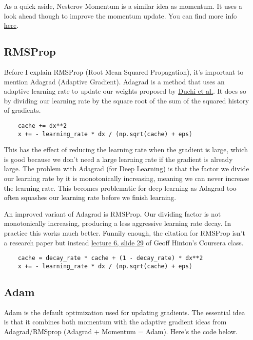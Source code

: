 \documentclass[12pt]{article}
\begin{document}
As a quick aside, Nesterov Momentum is a similar idea as momentum. It uses a look ahead though 
to improve the momentum update. You can find more info \href{https://cs231n.github.io/neural-networks-3/#sgd}{here}.

\subsection{RMSProp}
Before I explain RMSProp (Root Mean Squared Propagation), it's important to mention Adagrad (Adaptive
Gradient). Adagrad is a method that uses an adaptive learning rate to update our weights proposed by 
\href{https://jmlr.org/papers/v12/duchi11a.html}{Duchi et al.}. It does so 
by dividing our learning rate by the square root of the sum of the squared history of gradients. 

\begin{verbatim}
    cache += dx**2
    x += - learning_rate * dx / (np.sqrt(cache) + eps)
\end{verbatim}


This has the effect of reducing 
the learning rate when the gradient is large, which is good because we don't need a large learning rate
if the gradient is already large. The problem with Adagrad (for Deep Learning) is that the factor we divide 
our learning rate by it is monotonically increasing, meaning we can never increase the learning rate. 
This becomes problematic for deep learning as Adagrad too often squashes our learning rate before 
we finish learning. 

An improved variant of Adagrad is RMSProp. Our dividing factor is not monotonically increasing, 
producing a less aggressive learning rate decay. In practice this works much better. Funnily enough, 
the citation for RMSProp isn't a research paper but instead \href{http://www.cs.toronto.edu/~tijmen/csc321/slides/lecture_slides_lec6.pdf}
{lecture 6, slide 29} of Geoff Hinton's Coursera class. 

\begin{verbatim}
    cache = decay_rate * cache + (1 - decay_rate) * dx**2
    x += - learning_rate * dx / (np.sqrt(cache) + eps)
\end{verbatim}

\subsection{Adam}
Adam is the default optimization used for updating gradients. The essential idea is that it
combines both momentum with the adaptive gradient ideas from Adagrad/RMSprop (Adagrad + Momentum 
= Adam). Here's the code below. 
\end{document}
